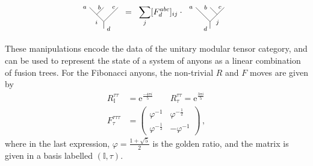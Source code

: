 \documentclass[aps, prl, letterpaper, twocolumn, superscriptaddress, notitlepage, 10pt]{revtex4-1}
\newcommand{\e}{\mathrm{e}}
\begin{document}
	\begin{align}
		\begin{tikzpicture}[baseline=0.6cm,scale=0.3]
			\draw(0,0)--(0,1)--(-2,3);
			\draw(0,3)--(-1,2);
			\draw(2,3)--(0,1);
			\node at (-0.45,1.6) [anchor=north east] {{\scriptsize $i$}};
			\node at (0,0) [anchor=west] {{\scriptsize $d$}};
			\node at (2,3) [anchor=east] {{\scriptsize $c$}};
			\node at (0,3) [anchor=east] {{\scriptsize $b$}};
			\node at (-2,3) [anchor=east] {{\scriptsize $a$}};
		\end{tikzpicture}
		&\;\;=\;\;\sum_j[F^{abc}_d]_{ij}\cdot\;
		\begin{tikzpicture}[baseline=0.6cm,scale=0.3]		
			\draw(0,0)--(0,1)--(-2,3);
			\draw(0,3)--(1,2);
			\draw(2,3)--(0,1);
			\node at (0.42,1.63) [anchor=north west] {{\scriptsize $j$}};
			\node at (0,0) [anchor=east] {{\scriptsize $d$}};
			\node at (2,3) [anchor=east] {{\scriptsize $c$}};
			\node at (0,3) [anchor=east] {{\scriptsize $b$}};
			\node at (-2,3) [anchor=east] {{\scriptsize $a$}};
		\end{tikzpicture}
	\end{align}

These manipulations encode the data of the unitary modular tensor category, and can be used to represent the state of a system of anyons as a linear combination of fusion trees. For the Fibonacci anyons, the non-trivial $R$ and $F$ moves are given by
\begin{align}
	R_{\mathbb{I}}^{\tau\tau}&= \e^{\frac{-4\pi i}{5}}\qquad R_\tau^{\tau\tau}= \e^{\frac{3\pi i}{5}}\\
	F_{\tau}^{\tau\tau\tau} &= \begin{pmatrix}\varphi^{-1}&\varphi^{-\frac{1}{2}}\\\varphi^{-\frac{1}{2}}&-\varphi^{-1}\end{pmatrix} \,,
\end{align}
where in the last expression, $\varphi=\frac{1+\sqrt{5}}{2}$ is the golden ratio, and the matrix is given in a basis labelled $(\mathbb{I},\tau)$.
\end{document}
